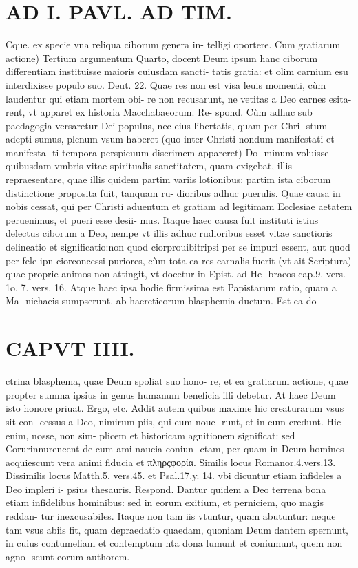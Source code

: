 \documentclass{article}
\begin{document}
\begin{pages}
\section*{AD I. PAVL. AD TIM. }
\marginpar{[ p.194 ]}\pstart Cque. ex specie vna reliqua ciborum genera in- telligi oportere.  \pend\pstart Cum gratiarum actione) Tertium argumentum  \pend\pstart Quarto, docent Deum ipsum hanc ciborum differentiam instituisse maioris cuiusdam sancti- tatis gratia: et olim carnium esu interdixisse populo suo. Deut. 22. Quae res non est visa leuis momenti, cùm laudentur qui etiam mortem obi- re non recusarunt, ne vetitas a Deo carnes esita- rent, vt apparet ex historia Macchabaeorum. Re- spond. Cùm adhuc sub paedagogia versaretur Dei populus, nec eius libertatis, quam per Chri- stum adepti sumus, plenum vsum haberet (quo inter Christi nondum manifestati et manifesta- ti tempora perspicuum discrimem appareret) Do- minum voluisse quibusdam vmbris vitae spiritualis sanctitatem, quam exigebat, illis repraesentare, quae illis quidem partim variis lotionibus: partim ista ciborum distinctione proposita fuit, tanquam ru- dioribus adhuc puerulis. Quae causa in nobis cessat, qui per Christi aduentum et gratiam ad legitimam Ecclesiae aetatem peruenimus, et pueri esse desii- mus. Itaque haec causa fuit instituti istius delectus ciborum a Deo, nempe vt illis adhuc rudioribus esset vitae sanctioris delineatio et significatio:non quod ciorprouibitripsi per se impuri essent, aut quod per fele ipn ciorconcessi puriores, cùm tota ea res carnalis fuerit (vt ait Scriptura) quae proprie animos non attingit, vt docetur in Epist. ad He- braeos cap.9. vers. 1o. 7. vers. 16. Atque haec ipsa hodie firmissima est Papistarum ratio, quam a Ma- nichaeis sumpserunt.  \pend\pstart ab haereticorum blasphemia ductum. Est ea do-  \pend
\section*{CAPVT  IIII. }
\marginpar{[ p.195 ]}\pstart ctrina blasphema, quae Deum spoliat suo hono- re, et ea gratiarum actione, quae propter summa ipsius in genus humanum beneficia illi debetur. At haec Deum isto honore priuat. Ergo, etc. Addit autem quibus maxime hic creaturarum vsus sit con- cessus a Deo, nimirum piis, qui eum noue- runt, et in eum credunt. Hic enim, nosse, non sim- plicem et historicam agnitionem significat: sed Corurinnurencent de cum ami naucia coniun- ctam, per quam in Deum homines acquiescunt vera animi fiducia et πληρςφορία. Similis locus Romanor.4.vers.13.  \pend\pstart Dissimilis locus Matth.5. vers.45. et Psal.17.y. 14. vbi dicuntur etiam infideles a Deo impleri i- psius thesauris. Respond. Dantur quidem a Deo terrena bona etiam infidelibus hominibus: sed in eorum exitium, et perniciem, quo magis reddan- tur inexcusabiles. Itaque non tam iis vtuntur, quam abutuntur: neque tam vsus abiis fit, quam depraedatio quaedam, quoniam Deum dantem spernunt, in cuius contumeliam et contemptum nta dona lumunt et coniumunt, quem non agno- scunt eorum authorem.  \pend
{}
{}

\end{pages}
\end{document}

